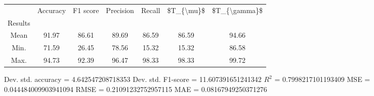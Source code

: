 \begin{tabular}{|c|c|c|c|c|c|c|}
\toprule
{} &  Accuracy &  F1 score &  Precision &  Recall &  \$T\_\{\textbackslash mu\}\$ &  \$T\_\{\textbackslash gamma\}\$ \\
Results &           &           &            &         &            &               \\
\hline
Mean    &     91.97 &     86.61 &      89.69 &   86.59 &      86.59 &         94.66 \\
Min.    &     71.59 &     26.45 &      78.56 &   15.32 &      15.32 &         86.58 \\
Max.    &     94.73 &     92.39 &      96.47 &   98.33 &      98.33 &         99.72 \\
\bottomrule
\end{tabular}

 Dev. std. accuracy = 4.642547208718353
 Dev. std. F1-score = 11.607391651241342
 $R^2$ = 0.7998217101193409
 MSE = 0.044484009903941094
 RMSE = 0.21091232752957115
 MAE = 0.08167949250371276